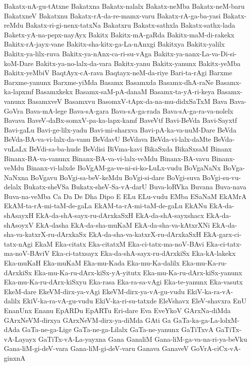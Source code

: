 {Bakatx-nA-gu-tAtxne
Bakatxna
Bakatx-nalalx
Bakatx-neMba
Bakatx-neM-baru
BakatxneV
Bakatxnu
Bakatx-rA-da-re-mamx-varu
Bakatx-rA-ga-ba-yasi
Bakatx-reMdu
Bakatx-ri-gi-nenx-tatxNa
Bakatxru
Bakatx-sathxla
Bakatx-sathx-lada
Baketx-yA-na-pepx-nayAyx
Bakitx
Bakitx-mA-gaRda
Bakitx-maM-di-rakekx
Bakitx-rA-jayx-vane
Bakitx-sha-kitx-ga-La-nAnxgi
Bakitxya
Bakitx-yalilx
Bakitx-ya-lilx-ruva
Bakitx-ya-nAnx-ca-ri-su-vAga
Bakitx-ya-nanx-La-va-Di-si-koM-Dare
Bakitx-ya-no-lalx-da-vara
Bakitx-yanu
Bakitx-yanunx
Bakitx-yeMba
Bakitx-yeMbiV
BaqtAyx-cA-rava
Baqtayx-neM-da-riye
Bari-ta-rAgi
Barxme
Barxme-yanunx
Barxme-yiMda
Basamx
Basamxda
Basamx-dhA-raNe
Basamx-ka-lapxmf
Basamxkekx
Basamx-saM-pA-danaM
Basamx-ta-yA-ri-keya
Basamx-vanunx
BasamxveV
Basamxvu
BasomxV-tApx-da-na-mu-didxSaTxM
Bava
Bava-GoVra
Bava-mA-lege
Bava-sA-gara
Bava-sA-ga-rada
Bava-sA-ga-ra-va-nolelx
Bavava
BaveV-daBx-somxV-pa-ka-lapx-kamf
BaveVtf
Bavi-BeVda
Bavi-Sayxtf
Bavi-gaLu
Bavi-ge-lilx-yadu
Bavi-mi-sharxva
Bavi-pA-ka-va-nuM-Dare
BeVda
BeVda-BA-va-vi-lalx-da-vanu
BeVdavU
BeVdava
BeVda-vi-lalx-daMte
BeVda-vuLaLx
BeVdi-sa-ba-hude
BeVdisi
BiVma-kavi
BikaSxda
BikaSxsaM
Binanx
Binanx-BA-va-vanunx
Binanx-BA-va-vi-lalx-veMdu
Binanx-BA-vavu
Binanx-veMdu
Binanx-vi-lalxde
BoVgAM-ga-ve-ni-si-ko-LuLx-vudu
BoVgaNaNx
BoVga-NaNxna
BoVgavu
BoVgi-sa-beV-keMdu
BoVgi-si-dare
BoVgi-suva
BoVgi-su-vu-delalx
Bukatx-sheVSa
Bukatx-sheV-Sa-vA-darU
Buva-loRVka
Buvana
Buva-nava
Buva-na-veMba
Ca
Da
De
Dha
Dipo
E
ELu
ELu-vudu
EMba
ESaNaM
EkAMrA
EkAM-ta-rA-mi-taM-de-gaLa
EkAM-ta-rA-mi-taM-de-gaLu
EkANu
EkA-da-shAsayxH
EkA-da-shA-sayx-ru-dArxkaSxH
EkA-da-shA-sayxshacx
EkA-da-shAsoyxV
EkA-dasha
EkA-da-sha-muKaM
EkA-da-sha-va-kAtxrXNi
EkA-da-sha-va-katxrX-ru-dArxkaSx
EkA-da-sha-va-katxrX-ru-dArxkaSxH
EkA-garx-ci-tatx-nAgi
EkaM
Eka-citatx
Eka-citatxM
Eka-ci-tatx-ma-noV-BAvi
Eka-ci-tatx-ma-noV-BAviV
Eka-ci-tatxsayx
Eka-da-shA-sayx-ru-dArxkiSx
Eka-kA-lakekx
Eka-muKaH
Eka-muKaM
Eka-mu-Kada
Eka-mu-Ka-dalilx
Eka-mu-Ka-ru-dArxkiSx
Eka-mu-Ka-ru-dArx-kiSx-yA-yitutx
Eka-mu-Ka-ru-dArx-kiSx-yanunx
Eka-mu-Ka-ru-dArx-kiSxyu
Eka-rasa
Eka-ra-sa-vAgi
Eka-te-yanunx
Eka-vasutx
EkeM-dare
EkeVM-dirx-ya-vAgi
EkeVM-dirx-ya-vA-gu-vudu
EkiV-ka-ra-vA-dalilx
EkiV-ka-ra-vA-gu-vudu
EkiV-ka-ri-su-tatxde
EleVshavx
EleV-shavxra
EnU
EnanUnx
Enanu
EpARDu
EpARTu
Eri-dare
Eva
EveYkoV
GArxNa-diMda
GArxNeVM-dirxya
GArxNeVM-dirx-ya-diMda
GAti
Ga
GaTa-ka-ga-La-lolxM-dAda
GaTa-ne-ga-Lige
GaTa-ne-ga-Lilalx
GaTa-ne-yanunx
GaTiTxvA
GaTiTx-vA-Layayx
GaTiTx-vA-La-yayxna
Gana
GanaliM
Gana-liM-ga-va-na-ri-ya-beVku
Gana-liM-gi-deV-vara
Gana-liM-gi-deV-varu
Ganava
GanaveV
GoVrA-ciCx-vA-ginxnA
}
